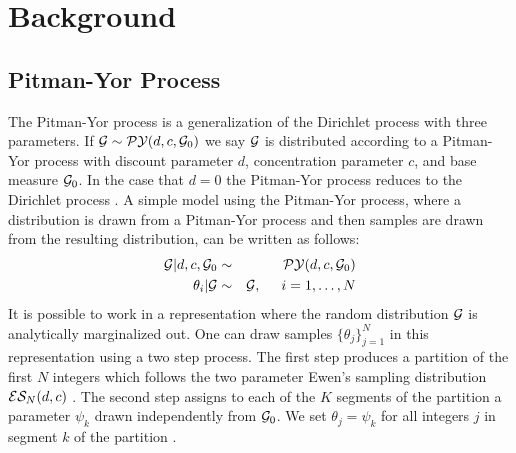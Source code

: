 
\section{Background}
\label{basicModel}

\subsection{Pitman-Yor Process}

The Pitman-Yor process is a generalization of the Dirichlet process with three parameters.   If $\G \sim \PY(d,c,\G_0)$ we say $\G$ is distributed according to a Pitman-Yor process with discount parameter $d$, concentration parameter $c$, and base measure $\G_0$. In the case that $d = 0$ the Pitman-Yor process reduces to the Dirichlet process \cite{Pitman1997}.  A simple model using the Pitman-Yor process, where a distribution is drawn from a Pitman-Yor process and then samples are drawn from the resulting distribution, can be written as follows:
%
\begin{eqnarray*}
\G | d,c,\G_0 &\sim& \PY(d,c,\G_0)\\
\theta_i | \G &\sim& \G,  \hspace{.5cm} i = 1, \dots, N
\end{eqnarray*}
%
It is possible to work in a representation where the random distribution $\G$ is analytically marginalized out.  One can draw samples $\{ \theta_j \}_{j = 1}^N$ in this representation using a two step process.  The first step produces a partition of the first $N$ integers which follows the two parameter Ewen's sampling distribution $\ES_N(d,c)$ \cite{Ewens1995}.  The second step assigns to each of the $K$ segments of the partition a parameter $\psi_k$ drawn independently from $\G_0$.  We set $\theta_j = \psi_k$ for all integers $j$ in segment $k$ of the partition \cite{Blackwell1973}.


